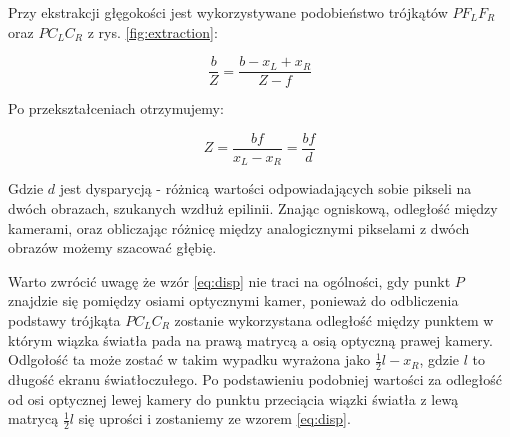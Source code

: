 \documentclass[oneside, eng]{mgr}
\begin{document}
Przy ekstrakcji głęgokości jest wykorzystywane podobieństwo trójkątów $P F_L F_R$ oraz $P C_L C_R$ z rys. \ref{fig:extraction}:

\begin{equation}
	\frac{b}{Z} = \frac{b-x_L+x_R}{Z-f}
	\label{eq:disp}
\end{equation}

Po przekształceniach otrzymujemy:

\begin{equation}
	Z = \frac{bf}{x_L-x_R} = \frac{bf}{d}
\end{equation}

Gdzie $d$ jest dysparycją - różnicą wartości odpowiadających sobie pikseli na dwóch obrazach, szukanych wzdłuż epilinii.
Znając ogniskową, odległość między kamerami, oraz obliczając różnicę między analogicznymi pikselami z dwóch obrazów możemy szacować głębię.

Warto zwrócić uwagę że wzór \ref{eq:disp} nie traci na ogólności, gdy punkt $P$ znajdzie się pomiędzy osiami optycznymi kamer, ponieważ do odbliczenia podstawy trójkąta $P C_L C_R$ zostanie wykorzystana odległość między punktem w którym wiązka światła pada na prawą matrycą a osią optyczną prawej kamery. Odlgołość ta może zostać w takim wypadku wyrażona jako $\frac{1}{2}l-x_R$, gdzie $l$ to długość ekranu światłoczułego. Po podstawieniu podobniej wartości za odległość od osi optycznej lewej kamery do punktu przeciącia wiązki światła z lewą matrycą $\frac{1}{2}l$ się uprości i zostaniemy ze wzorem \ref{eq:disp}.
\end{document}
